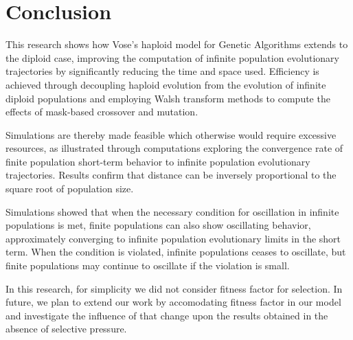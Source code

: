 \chapter{Conclusion}
This research shows how Vose's haploid model for Genetic Algorithms
extends to the diploid case, improving the computation of infinite
population evolutionary trajectories by significantly reducing the
time and space used.  Efficiency is achieved through decoupling
haploid evolution from the evolution of infinite diploid populations
and employing Walsh transform methods to compute the effects of
mask-based crossover and mutation.  

Simulations are thereby made feasible which otherwise would require
excessive resources, as illustrated through computations exploring 
the convergence rate of finite population short-term behavior to infinite population evolutionary trajectories. 
Results confirm that distance can be inversely proportional to the square root of population size.

Simulations showed that when the necessary condition for oscillation in infinite populations is met, 
finite populations can also show oscillating behavior, approximately converging to 
infinite population evolutionary limits in the short term. When the condition is violated, 
infinite populations ceases to oscillate, but finite populations may continue to oscillate if the violation is small.

In this research, for simplicity we did not consider fitness factor for selection.  
In future, we plan to extend our work by accomodating fitness factor in our model and investigate 
the influence of that change upon the results obtained in the absence of selective pressure.



